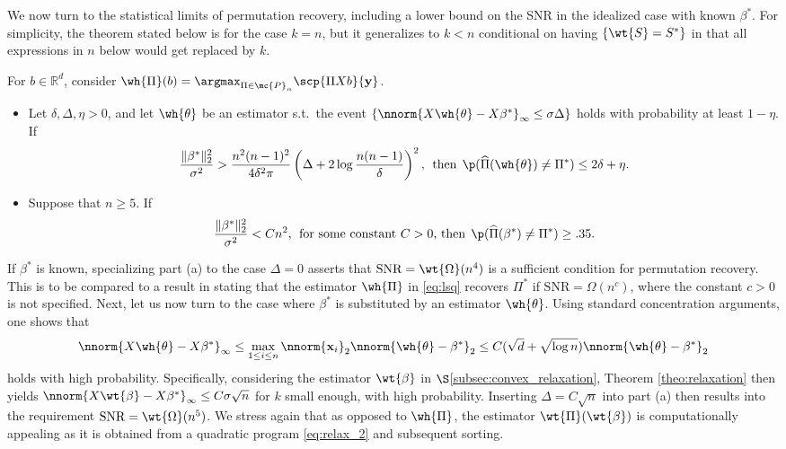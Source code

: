 \documentclass[11pt]{article}
\def\R{\mathbb{R}}
\def\x{\mathbf{x}}
\def\y{\mathbf{y}}
\begin{document}
We now turn to the statistical limits of permutation recovery, including a lower bound on the SNR in the idealized case with known $\beta^*$. 
For simplicity, the theorem stated below is for the case $k = n$, but it generalizes to $k < n$ conditional on
having $\{\wt{S} = S^* \}$ in that all expressions in $n$ below would get replaced by $k$.
\begin{theo}\label{theo:permutationrecovery}
  For $b \in \R^d$, consider $\wh{\Pi}(b) = \argmax_{\Pi \in \mc{P}_n} \scp{\Pi X b}{\y}$.  
\begin{itemize}
\item[(a)] Let $\delta, \Delta, \eta > 0$, and let $\wh{\theta}$ be an estimator s.t.~the event $\{\nnorm{X \wh{\theta} - X\beta^*}_{\infty} \leq \sigma \Delta \}$ holds with probability at least $1 - \eta$. If 
  \begin{equation*}
    \dfrac{\|\beta^*\|_2^2}{\sigma^2}>\dfrac{n^2(n-1)^2}{4 \delta^2\pi} \left( \Delta + 2 \log\dfrac{n(n-1)}{\delta} \right)^2, \: \: \text{then} \: \: \p(\widehat{\Pi}(\wh{\theta}) \ne \Pi^*)\le 2\delta + \eta.
  \end{equation*}
\item[(b)] Suppose that $n \geq 5$. If
  \begin{equation*}
    \dfrac{\|\beta^*\|_2^2}{\sigma^2}< C n^2, \: \: \text{for some constant $C>0$, then} \: \: \p(\widehat{\Pi}(\beta^*)\ne \Pi^*)\ge .35.
  \end{equation*}
\end{itemize}
\end{theo}
\noindent If $\beta^*$ is known, specializing part (a) to the case $\Delta = 0$ asserts that $\text{SNR} = \wt{\Omega}(n^4)$ is a sufficient condition for permutation recovery. This is to be compared to a result in \cite{Pananjady2016} stating that the estimator
$\wh{\Pi}$ in \eqref{eq:lsq} recovers $\Pi^*$ if $\text{SNR} = \Omega(n^c)$, where the constant $c > 0$ is not specified. Next, let us now turn to the case where $\beta^*$ is substituted by an estimator $\wh{\theta}$. Using standard concentration arguments, one shows that
\begin{equation*}
  \nnorm{X \wh{\theta} - X\beta^*}_{\infty} \leq \max_{1 \leq i \leq n} \nnorm{\x_i}_2 \nnorm{\wh{\theta} - \beta^*}_2 \leq
  C (\sqrt{d} + \sqrt{\log n}) \nnorm{\wh{\theta} - \beta^*}_2
\end{equation*}
holds with high probability. Specifically, considering the estimator $\wt{\beta}$ in $\S$\ref{subsec:convex_relaxation}, Theorem \ref{theo:relaxation} then yields $\nnorm{X \wt{\beta} - X\beta^*}_{\infty} \leq C \sigma \sqrt{n}$ for $k$ small enough, with high probability. Inserting $\Delta = C \sqrt{n}$ into part (a) then results into the requirement $\text{SNR} = \wt{\Omega}(n^5)$. We stress again that as opposed to $\wh{\Pi}$, the estimator $\wt{\Pi}(\wt{\beta})$ is computationally appealing as it is obtained from a quadratic program \eqref{eq:relax_2} and subsequent sorting.
\end{document}
